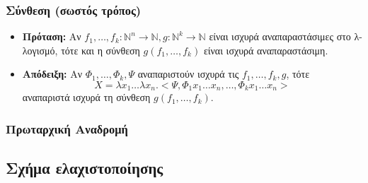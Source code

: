 \documentclass{beamer}
\begin{document}
\begin{frame}
        \frametitle{Σύνθεση (σωστός τρόπος)}
        \begin{itemize}
                \item \textbf{Πρόταση:} Αν $f_1,\ldots,f_k : \mathbb{N}^n \rightarrow \mathbb{N}, g : \mathbb{N}^k \rightarrow \mathbb{N}$ είναι ισχυρά αναπαραστάσιμες στο λ-λογισμό, τότε και η σύνθεση 
                 $g(f_1,\ldots,f_k)$ είναι ισχυρά αναπαραστάσιμη. \pause
                 \item \textbf{Απόδειξη:} Αν $\Phi_1, \ldots, \Phi_k, \Psi$ αναπαριστούν ισχυρά τις
                  $f_1,\ldots, f_k, g$, τότε
                  $$X = \lambda x_1 \ldots \lambda x_n . <\Psi, \Phi_1 x_1 \ldots x_n, \ldots, \Phi_k x_1 \ldots x_n> $$
                  αναπαριστά ισχυρά τη σύνθεση $g(f_1,\ldots,f_k)$. 
        \end{itemize}
\end{frame}

\subsubsection{Πρωταρχική Αναδρομή}
\subsection{Σχήμα ελαχιστοποίησης}
\end{document}
